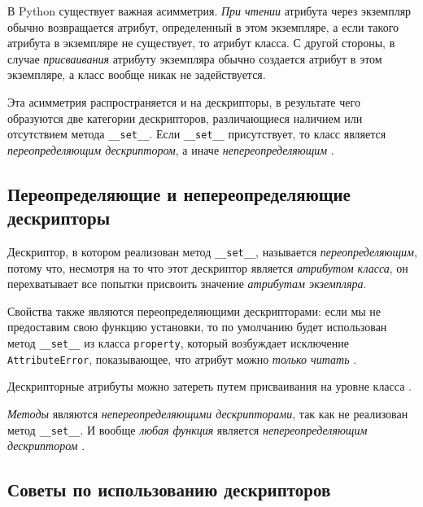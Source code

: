 \documentclass[%
	11pt,
	a4paper,
	utf8,
		]{article}
\begin{document}
В Python существует важная асимметрия. \emph{При чтении} атрибута через экземпляр обычно возвращается атрибут, определенный в этом экземпляре, а если такого атрибута в экземпляре не существует, то атрибут класса. С другой стороны, в случае \emph{присваивания} атрибуту экземпляра обычно создается атрибут в этом экземпляре, а класс вообще никак не задействуется.

Эта асимметрия распространяется и на дескрипторы, в результате чего образуются две категории дескрипторов, различающиеся наличием или отсутствием метода \verb|__set__|. Если \verb*|__set__| присутствует, то класс является \emph{переопределяющим дескриптором}, а иначе \emph{непереопределяющим} \cite[]{ramalho:python-2022}.

\subsection{Переопределяющие и непереопределяющие дескрипторы}

Дескриптор, в котором реализован метод \verb|__set__|, называется \emph{переопределяющим}, потому что, несмотря на то что этот дескриптор является \emph{атрибутом класса}, он перехватывает все попытки присвоить значение \emph{атрибутам экземпляра}.

Свойства также являются переопределяющими дескрипторами: если мы не предоставим свою функцию установки, то по умолчанию будет использован метод \verb*|__set__| из класса \verb|property|, который возбуждает исключение \verb*|AttributeError|, показывающее, что атрибут можно \emph{только читать} \cite[]{ramalho:python-2022}.

Дескрипторные атрибуты можно затереть путем присваивания на уровне класса \cite[]{ramalho:python-2022}.

\emph{Методы} являются \emph{непереопределяющими дескрипторами}, так как не реализован метод \verb|__set__|. И вообще \emph{любая функция} является \emph{непереопределяющим дескриптором} \cite[]{ramalho:python-2022}.

\subsection{Советы по использованию дескрипторов}
\end{document}
